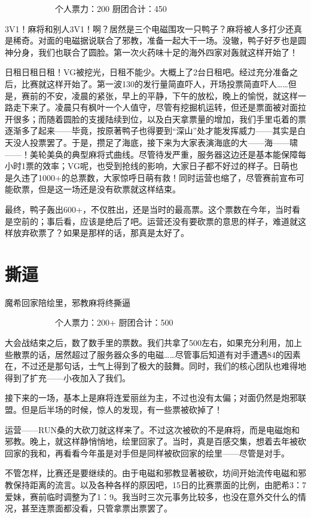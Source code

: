 　　　　　　个人票力：200 厨团合计：450

3V1！麻将和别人3V1！啊？居然是三个电磁围攻一只鸭子？麻将被人多打少还真是稀奇。对面的电磁据说联合了邪教，准备一起大干一场。没辙，鸭子好歹也是圆神分身，我们也联合了圆脸。第一次火药味十足的海外四家对轰就这样开始了！

日租日租日租！VG被挖光，日租不能少。大概上了2台日租吧。经过充分准备之后，比赛就这样开始了。第一波130的发行量简直吓人，开场投票简直吓人……但是，赛前的不安，凌晨的紧张，早上的平静，下午的放松，晚上的愉悦，就这样一路走下来了。凌晨只有枫叶一个人值守，尽管有挖掘机运转，但还是票面被对面拉开很多；而随着圆脸的支援陆续到位，以及白天拿票量的增加，我们手里屯着的票逐渐多了起来——毕竟，按原著鸭子也得要到“深山”处才能发挥威力——其实是白天没人投票罢了。于是，攒足了海底，接下来为大家表演海底的大——海——啸——！美轮美奂的典型麻将式曲线。尽管待发严重，服务器这边还是基本能保障每小时1票的效率；VG呢，也受到抢线的影响，大家日子都不好过的样子。日萌也是久违了1000+的总票数，大家惊呼日萌有救！同时运营也缩了，尽管赛前宣布可能砍票，但是这一场还是没有砍票就这样结束。

最终，鸭子轰出600+，不仅胜出，还是当时的最高票。这个票数在今年，当时看是空前的；事后看，应该是绝后了吧。运营还没有要砍票的意思的样子，难道就这样放弃砍票了？如果是那样的话，那真是太好了。


\section{撕逼}
魔希回家陪绘里，邪教麻将终撕逼

　　　　　　个人票力：200+ 厨团合计：500

大会战结束之后，数了数手里的票数。我们共拿了500左右，如果充分利用，加上些散票的话，居然超过了服务器众多的电磁……尽管事后知道有对手遭遇84的因素在，不过还是那句话，士气上得到了极大的鼓舞。同时，我们的核心团队也难得地得到了扩充——小夜加入了我们。

接下来的一场，基本上是麻将连爱丽丝为主，不过也没有太偏；对面仍然是炮邪联盟。但是后半场的时候，惊人的发现，有一些票被砍掉了！

运营——RUN桑的大砍刀就这样来了。不过这次被砍的不是麻将，而是电磁炮和邪教。晚上，就这样静悄悄地，绘里回家了。当时，真是百感交集，想着去年被砍回家的我和，再看看今年虽是对手但是同样被砍回家的绘里——尽管是对手。

不管怎样，比赛还是要继续的。由于电磁和邪教显著被砍，坊间开始流传电磁和邪教保持距离的流言。以及各种各样的原因吧，15日的比赛票面的比例，由肥希3：7爱妹，赛前临时调整为了1：9。我当时三次元事务比较多，也没在意外交什么的情况，甚至连票面都没看，只管拿票出票罢了。

